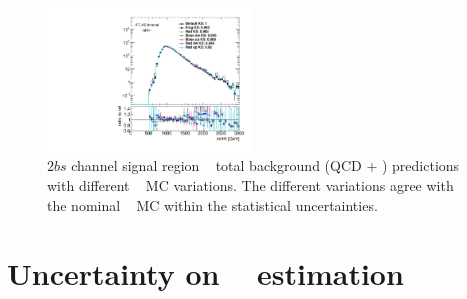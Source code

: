 \begin{figure}[htb!]
\begin{center} 
\includegraphics[width=0.48\textwidth,angle=-90]{figures/boosted/Other/directcompare_mHH_l_1_TwoTag_split_Top_syst_stat_postfit_all_.pdf}
\caption{$2bs$ channel signal region \mtwoJ~ total background (QCD + \ttbar) predictions with different \ttbar~ MC variations. The different variations agree with the nominal \ttbar~ MC within the statistical uncertainties.}
\label{fig:ttbar-MC}
\end{center}
\end{figure}



\section{Uncertainty on \muqcd~ estimation}
\label{sec:non-closure-mu-qcd}

